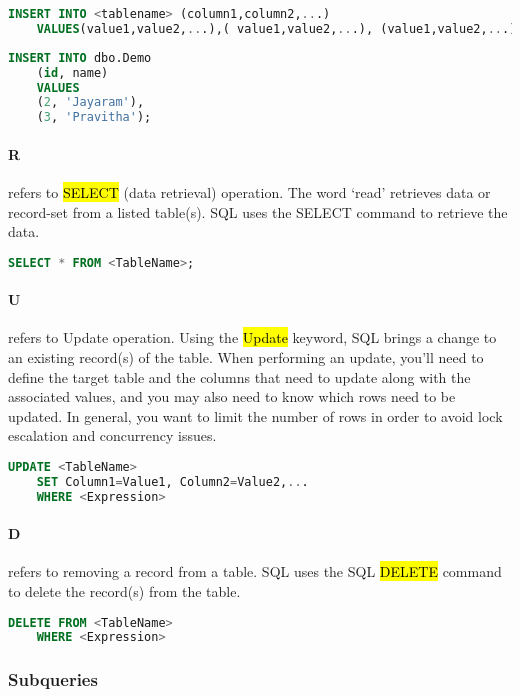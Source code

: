 \begin{lstlisting}[language=SQL]
	INSERT INTO <tablename> (column1,column2,...) 
	VALUES(value1,value2,...),( value1,value2,...), (value1,value2,...)...
\end{lstlisting}

\begin{lstlisting}[language=SQL]
	INSERT INTO dbo.Demo
	(id, name)
	VALUES
	(2, 'Jayaram'),
	(3, 'Pravitha');
\end{lstlisting}

\paragraph{R} refers to \hl{SELECT} (data retrieval) operation. The word ‘read’ retrieves data or record-set from a listed table(s). SQL uses the SELECT command to retrieve the data.

\begin{lstlisting}[language=SQL]
	SELECT * FROM <TableName>;
\end{lstlisting}

\paragraph{U} refers to Update operation. Using the \hl{Update} keyword, SQL brings a change to an existing record(s) of the table. When performing an update, you’ll need to define the target table and the columns that need to update along with the associated values, and you may also need to know which rows need to be updated. In general, you want to limit the number of rows in order to avoid lock escalation and concurrency issues.

\begin{lstlisting}[language=SQL]
	UPDATE <TableName>
	SET Column1=Value1, Column2=Value2,...
	WHERE <Expression>
\end{lstlisting}

\paragraph{D} refers to removing a record from a table. SQL uses the SQL \hl{DELETE} command to delete the record(s) from the table.

\begin{lstlisting}[language=SQL]
	DELETE FROM <TableName>
	WHERE <Expression>
\end{lstlisting}

\subsubsection{Subqueries}
\label{sec:Subquery}

